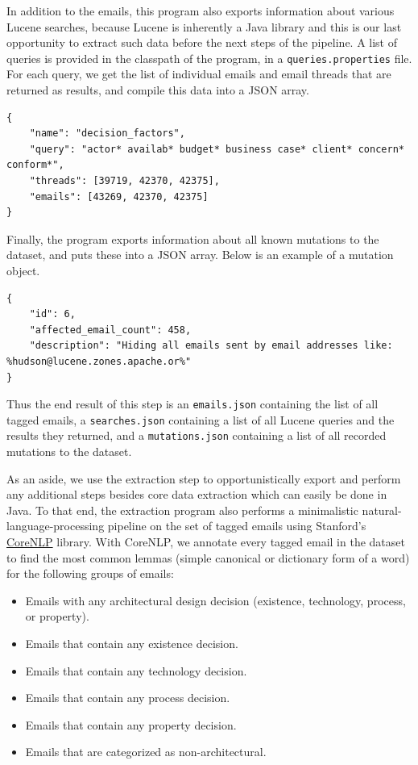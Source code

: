 \documentclass[a4paper, 12pt]{article}
\begin{document}
			In addition to the emails, this program also exports information about various Lucene searches, because Lucene is inherently a Java library and this is our last opportunity to extract such data before the next steps of the pipeline. A list of queries is provided in the classpath of the program, in a \texttt{queries.properties} file. For each query, we get the list of individual emails and email threads that are returned as results, and compile this data into a JSON array.
			
			\begin{verbatim}
{
	"name": "decision_factors",
	"query": "actor* availab* budget* business case* client* concern* conform*",
	"threads": [39719, 42370, 42375],
	"emails": [43269, 42370, 42375]
}
			\end{verbatim}
		
			Finally, the program exports information about all known mutations to the dataset, and puts these into a JSON array. Below is an example of a mutation object.
			
			\begin{verbatim}
{
	"id": 6,
	"affected_email_count": 458,
	"description": "Hiding all emails sent by email addresses like: %hudson@lucene.zones.apache.or%"
}
			\end{verbatim}
		
			Thus the end result of this step is an \texttt{emails.json} containing the list of all tagged emails, a \texttt{searches.json} containing a list of all Lucene queries and the results they returned, and a \texttt{mutations.json} containing a list of all recorded mutations to the dataset.
			
			As an aside, we use the extraction step to opportunistically export and perform any additional steps besides core data extraction which can easily be done in Java. To that end, the extraction program also performs a minimalistic natural-language-processing pipeline on the set of tagged emails using Stanford's \href{https://stanfordnlp.github.io/CoreNLP/}{CoreNLP} library. With CoreNLP, we annotate every tagged email in the dataset to find the most common lemmas (simple canonical or dictionary form of a word\cite{francis}) for the following groups of emails:
			\begin{itemize}
				\item Emails with any architectural design decision (existence, technology, process, or property).
				\item Emails that contain any existence decision.
				\item Emails that contain any technology decision.
				\item Emails that contain any process decision.
				\item Emails that contain any property decision.
				\item Emails that are categorized as non-architectural.
			\end{itemize}
		
\end{document}
